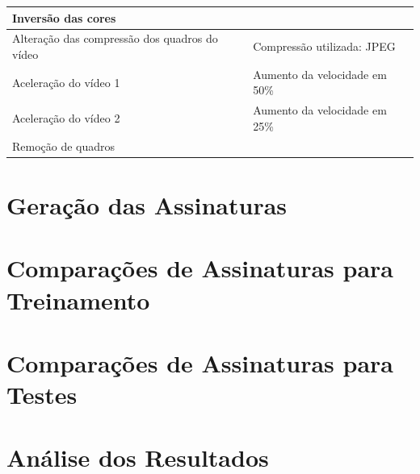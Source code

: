\begin{table}[h]
\begin{tabular}{|l|l|}
\multicolumn{1}{|l|}{Inversão das cores}                                          & \multicolumn{1}{l|}{}                                                                                                    \\ \hline
\multicolumn{1}{|l|}{Alteração das compressão dos quadros do vídeo}               & \multicolumn{1}{l|}{Compressão utilizada: JPEG}                                                                          \\ \hline
\multicolumn{1}{|l|}{Aceleração do vídeo 1}                                       & \multicolumn{1}{l|}{Aumento da velocidade em 50\%}                                                                       \\ \hline
\multicolumn{1}{|l|}{Aceleração do vídeo 2}                                       & \multicolumn{1}{l|}{Aumento da velocidade em 25\%}                                                                       \\ \hline
Remoção de quadros                                                                &                                                                                                                          \\ \hline
\end{tabular}
\end{table}

\section{Geração das Assinaturas}
\label{sec:met-assinaturas}

\section{Comparações de Assinaturas para Treinamento}
\label{sec:met-comparacao-treinamento}

\section{Comparações de Assinaturas para Testes}
\label{sec:met-comparacao-testes}


\section{Análise dos Resultados}
\label{sec:met-analise}



